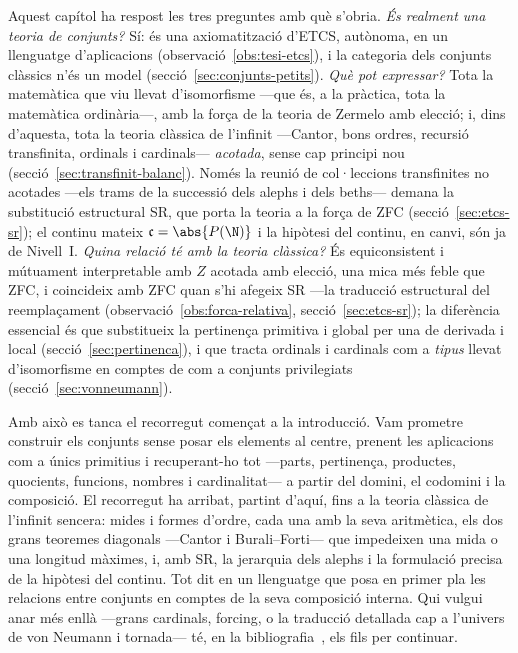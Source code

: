 \begin{observacio}\label{obs:balanc-metateoric}
Aquest capítol ha respost les tres preguntes amb què s'obria. \emph{És
realment una teoria de conjunts?} Sí: és una axiomatització d'ETCS,
autònoma, en un llenguatge d'aplicacions
(observació~\ref{obs:tesi-etcs}), i la categoria dels conjunts clàssics
n'és un model (secció~\ref{sec:conjunts-petits}). \emph{Què pot expressar?}
Tota la matemàtica que viu llevat d'isomorfisme ---que és, a la pràctica,
tota la matemàtica ordinària---, amb la força de la teoria de Zermelo amb
elecció; i, dins d'aquesta, tota la teoria clàssica de l'infinit ---Cantor,
bons ordres, recursió transfinita, ordinals i cardinals--- \emph{acotada},
sense cap principi nou (secció~\ref{sec:transfinit-balanc}). Només la reunió
de col·leccions transfinites no acotades ---els trams de la successió dels alephs i
dels beths--- demana la substitució estructural SR, que porta la teoria a la
força de ZFC (secció~\ref{sec:etcs-sr}); el continu mateix
\(\mathfrak c=\abs{P(\N)}\) i la hipòtesi del continu, en canvi, són ja de
Nivell~I. \emph{Quina relació té amb la teoria clàssica?}
És equiconsistent i mútuament interpretable amb \(Z\) acotada amb elecció,
una mica més feble que ZFC, i coincideix amb ZFC quan s'hi afegeix SR ---la
traducció estructural del reemplaçament (observació~\ref{obs:forca-relativa},
secció~\ref{sec:etcs-sr}); la diferència essencial és que substitueix la
pertinença primitiva i global per una de derivada i local
(secció~\ref{sec:pertinenca}), i que tracta ordinals i cardinals com a
\emph{tipus} llevat d'isomorfisme en comptes de com a conjunts privilegiats
(secció~\ref{sec:vonneumann}).

Amb això es tanca el recorregut començat a la introducció. Vam prometre
construir els conjunts sense posar els elements al centre, prenent les
aplicacions com a únics primitius i recuperant-ho tot ---parts,
pertinença, productes, quocients, funcions, nombres i cardinalitat--- a
partir del domini, el codomini i la composició. El recorregut ha arribat,
partint d'aquí, fins a la teoria clàssica de l'infinit sencera: mides i
formes d'ordre, cada una amb la seva aritmètica, els dos grans teoremes
diagonals ---Cantor i Burali--Forti--- que impedeixen una mida o una
longitud màximes, i, amb SR, la jerarquia dels alephs i la formulació precisa
de la hipòtesi del continu. Tot dit en un llenguatge que posa en primer pla
les relacions entre conjunts en comptes de la seva composició interna. Qui
vulgui anar més enllà ---grans cardinals, forcing, o la traducció detallada
cap a l'univers de von Neumann i tornada--- té, en la
bibliografia~\cite{mclarty-catset,shulman-comparing,lawvere-rosebrugh}, els fils
per continuar.
\end{observacio}
